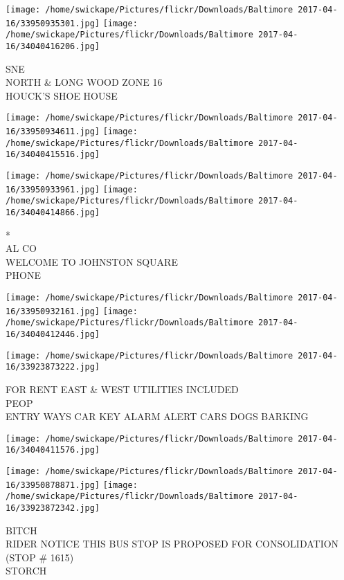 \documentclass[10pt,letterpaper]{article}
\begin{document}
\vspace{0.25in}
\texttt{[image: /home/swickape/Pictures/flickr/Downloads/Baltimore 2017-04-16/33950935301.jpg]}
\texttt{[image: /home/swickape/Pictures/flickr/Downloads/Baltimore 2017-04-16/34040416206.jpg]}

SNE\\
NORTH \& LONG WOOD ZONE 16\\
HOUCK'S SHOE HOUSE\\
\pagebreak

\texttt{[image: /home/swickape/Pictures/flickr/Downloads/Baltimore 2017-04-16/33950934611.jpg]}
\texttt{[image: /home/swickape/Pictures/flickr/Downloads/Baltimore 2017-04-16/34040415516.jpg]}

\texttt{[image: /home/swickape/Pictures/flickr/Downloads/Baltimore 2017-04-16/33950933961.jpg]}
\texttt{[image: /home/swickape/Pictures/flickr/Downloads/Baltimore 2017-04-16/34040414866.jpg]}

*\\
AL CO\\
WELCOME TO JOHNSTON SQUARE\\
PHONE\\
\pagebreak

\texttt{[image: /home/swickape/Pictures/flickr/Downloads/Baltimore 2017-04-16/33950932161.jpg]}
\texttt{[image: /home/swickape/Pictures/flickr/Downloads/Baltimore 2017-04-16/34040412446.jpg]}

\texttt{[image: /home/swickape/Pictures/flickr/Downloads/Baltimore 2017-04-16/33923873222.jpg]}

FOR RENT EAST \& WEST UTILITIES INCLUDED\\
PEOP\\
ENTRY WAYS CAR KEY ALARM ALERT CARS DOGS BARKING\\
\pagebreak

\texttt{[image: /home/swickape/Pictures/flickr/Downloads/Baltimore 2017-04-16/34040411576.jpg]}

\vspace{0.25in}
\texttt{[image: /home/swickape/Pictures/flickr/Downloads/Baltimore 2017-04-16/33950878871.jpg]}
\texttt{[image: /home/swickape/Pictures/flickr/Downloads/Baltimore 2017-04-16/33923872342.jpg]}

BITCH\\
RIDER NOTICE THIS BUS STOP IS PROPOSED FOR CONSOLIDATION (STOP \# 1615)\\
STORCH\\
\pagebreak
\end{document}
